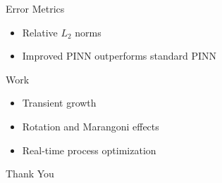 \documentclass{beamer}
\begin{document}
\begin{frame}{Error Metrics}
\begin{itemize}
\item Relative $L_2$ norms
\item Improved PINN outperforms standard PINN
\end{itemize}
\end{frame}



\begin{frame}{Work}
\begin{itemize}
\item Transient growth
\item Rotation and Marangoni effects
\item Real-time process optimization
\end{itemize}
\end{frame}




\begin{frame}
\Huge{\centerline{Thank You}}
\end{frame}

\end{document}
